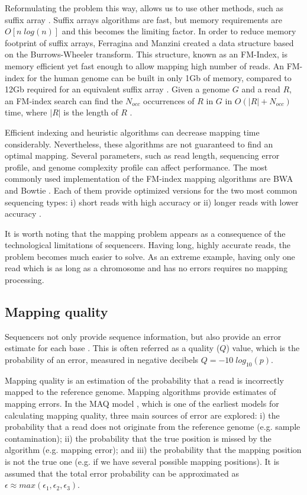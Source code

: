 Reformulating the problem this way, allows us to use other methods, such as suffix array \cite{durbin1998biological}. Suffix arrays algorithms are fast, but memory requirements are $O[ n \; log(n) ]$ and this becomes the limiting factor. In order to reduce memory footprint of suffix arrays, Ferragina and Manzini \cite{ferragina2000opportunistic} created a data structure based on the Burrows-Wheeler transform.  This structure, known as an FM-Index, is memory efficient yet fast enough to allow mapping high number of reads.  An FM-index for the human genome can be built in only 1Gb of memory, compared to 12Gb required for an equivalent suffix array \cite{li2010fast}.  Given a genome $G$ and a read $R$, an FM-index search can find the $N_{occ}$ occurrences of $R$ in $G$ in $O(|R| + N_{occ} )$ time, where $|R|$ is the length of $R$ \cite{li2010fast}.

Efficient indexing and heuristic algorithms can decrease mapping time considerably.  Nevertheless, these algorithms are not guaranteed to find an optimal mapping.  Several parameters, such as read length, sequencing error profile, and genome complexity profile can affect performance.  The most commonly used implementation of the FM-index mapping algorithms are BWA \cite{li2010fast, li2010fastlong} and Bowtie \cite{langmead2009ultrafast, langmead2012fast}.  Each of them provide optimized versions for the two most common sequencing types: i) short reads with high accuracy \cite{li2010fast,langmead2009ultrafast} or ii) longer reads with lower accuracy \cite{li2010fastlong, langmead2012fast}.

It is worth noting that the mapping problem appears as a consequence of the technological limitations of sequencers.  Having long, highly accurate reads, the problem becomes much easier to solve.  As an extreme example, having only one read which is as long as a chromosome and has no errors requires no mapping processing.  

\subsection{Mapping quality \label{sec:mapq}}

Sequencers not only provide sequence information, but also provide an error estimate for each base \cite{li2011statistical}.  This is often referred as a quality ($Q$) value, which is the probability of an error, measured in negative decibels $Q = -10 \; log_{10}(p)$.

Mapping quality is an estimation of the probability that a read is incorrectly mapped to the reference genome. Mapping algorithms provide estimates of mapping errors. In the MAQ model \cite{li2008mapping}, which is one of the earliest models for calculating mapping quality, three main sources of error are explored: i) the probability that a read does not originate from the reference genome (e.g. sample contamination); ii) the probability that the true position is missed by the algorithm (e.g. mapping error); and iii) the probability that the mapping position is not the true one (e.g. if we have several possible mapping positions). It is assumed that the total error probability can be approximated as $\epsilon \approx max(\epsilon_1,\epsilon_2, \epsilon_3)$.

